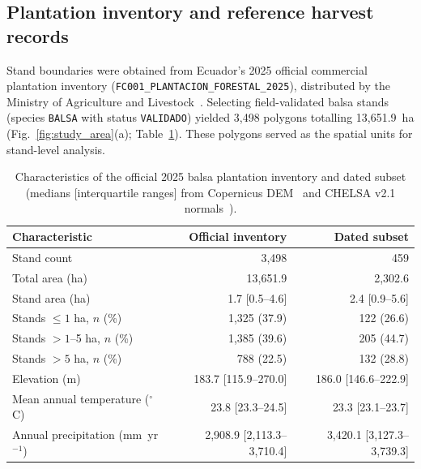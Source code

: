 \subsection{Plantation inventory and reference harvest records}
\label{sec:reference_data}

\begingroup
\setlength{\emergencystretch}{1em}
Stand boundaries were obtained from Ecuador's 2025 official commercial plantation inventory (\nolinkurl{FC001_PLANTACION_FORESTAL_2025}), distributed by the Ministry of Agriculture and Livestock~\citep{MAGGeoportal}. Selecting field-validated balsa stands (species \texttt{BALSA} with status \texttt{VALIDADO}) yielded 3,498 polygons totalling 13,651.9~ha (Fig.~\ref{fig:study_area}(a); Table~\ref{tab:inventory}). These polygons served as the spatial units for stand-level analysis.
\par\endgroup


\begin{table}[pos=!htbp]
    \centering
    \small
    \caption{Characteristics of the official 2025 balsa plantation inventory and dated subset (medians [interquartile ranges] from Copernicus DEM~\citep{ESA2022CopernicusDEM} and CHELSA v2.1 normals~\citep{Karger2021CHELSAv21}).}
    \label{tab:inventory}
    \begin{tabular*}{\textwidth}{@{\extracolsep{\fill}}lrr@{}}
        \toprule
        Characteristic & Official inventory & Dated subset \\
        \midrule
        Stand count & 3,498 & 459 \\
        Total area (ha) & 13,651.9 & 2,302.6 \\
        Stand area (ha) & 1.7 [0.5--4.6] & 2.4 [0.9--5.6] \\
        \midrule
        Stands $\leq1$ ha, $n$ (\%) & 1,325 (37.9) & 122 (26.6) \\
        Stands $>1$--5 ha, $n$ (\%) & 1,385 (39.6) & 205 (44.7) \\
        Stands $>5$ ha, $n$ (\%) & 788 (22.5) & 132 (28.8) \\
        \midrule
        Elevation (m) & 183.7 [115.9--270.0] & 186.0 [146.6--222.9] \\
        Mean annual temperature ($^{\circ}$C) & 23.8 [23.3--24.5] & 23.3 [23.1--23.7] \\
        Annual precipitation (mm~yr$^{-1}$) & 2,908.9 [2,113.3--3,710.4] & 3,420.1 [3,127.3--3,739.3] \\
        \bottomrule
    \end{tabular*}
\end{table}


